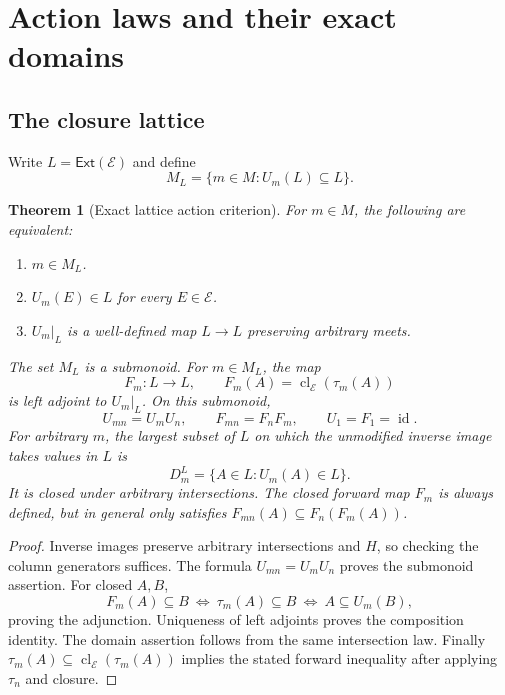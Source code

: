 \documentclass[11pt]{article}
\newtheorem{theorem}{Theorem}[section]
\theoremstyle{definition}
\newcommand{\Ext}{\mathsf{Ext}}
\newcommand{\cl}{\operatorname{cl}}
\newcommand{\id}{\operatorname{id}}
\begin{document}
\section{Action laws and their exact domains}

\subsection{The closure lattice}
Write $L=\Ext(\mathcal E)$ and define
\[
 M_L=\{m\in M:U_m(L)\subseteq L\}.
\]
\begin{theorem}[Exact lattice action criterion]\label{thm:latticeaction}
For $m\in M$, the following are equivalent:
\begin{enumerate}[label=(\roman*)]
\item $m\in M_L$.
\item $U_m(E)\in L$ for every $E\in\mathcal E$.
\item $U_m|_L$ is a well-defined map $L\to L$ preserving arbitrary meets.
\end{enumerate}
The set $M_L$ is a submonoid. For $m\in M_L$, the map
\[
 F_m:L\longrightarrow L,\qquad F_m(A)=\cl_{\mathcal E}(\tau_m(A))
\]
is left adjoint to $U_m|_L$. On this submonoid,
\[
 U_{mn}=U_mU_n,\qquad F_{mn}=F_nF_m,\qquad U_1=F_1=\id.
\]
For arbitrary $m$, the largest subset of $L$ on which the unmodified
inverse image takes values in $L$ is
\[
 D_m^L=\{A\in L:U_m(A)\in L\}.
\]
It is closed under arbitrary intersections. The closed forward map $F_m$
is always defined, but in general only satisfies
$F_{mn}(A)\subseteq F_n(F_m(A))$.
\end{theorem}

\begin{proof}
Inverse images preserve arbitrary intersections and $H$, so checking the
column generators suffices. The formula $U_{mn}=U_mU_n$ proves the
submonoid assertion. For closed $A,B$,
\[
 F_m(A)\subseteq B\ \Longleftrightarrow\
 \tau_m(A)\subseteq B\ \Longleftrightarrow\
 A\subseteq U_m(B),
\]
proving the adjunction. Uniqueness of left adjoints proves the composition
identity. The domain assertion follows from the same intersection law.
Finally $\tau_m(A)\subseteq\cl_{\mathcal E}(\tau_m(A))$ implies the
stated forward inequality after applying $\tau_n$ and closure.
\end{proof}
\end{document}
